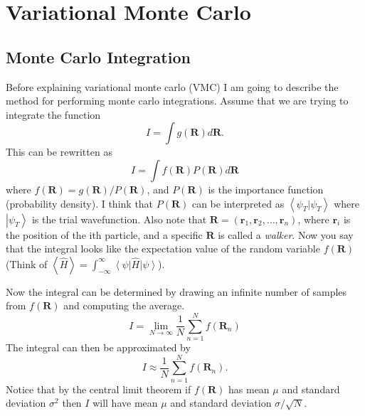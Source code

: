 \section*{Variational Monte Carlo}
\subsection*{Monte Carlo Integration}
Before explaining variational monte carlo (VMC) I am going to describe the method for performing monte carlo integrations. Assume that we are trying to integrate the function
\begin{equation}
  I = \int g(\mathbf{R})d\mathbf{R}.
\end{equation}
This can be rewritten as
\begin{equation}
  I = \int f(\mathbf{R})P(\mathbf{R})d\mathbf{R}
\end{equation}
where $f(\mathbf{R})=g(\mathbf{R})/P(\mathbf{R})$, and $P(\mathbf{R})$ is the importance function (probability density). I think that $P(\mathbf{R})$ can be interpreted as $\left<\psi_T|\psi_T\right>$ where $\left|\psi_T\right>$ is the trial wavefunction. Also note that $\mathbf{R}=(\mathbf{r}_1, \mathbf{r}_2, \ldots, \mathbf{r}_n)$, where $\mathbf{r}_i$ is the position of the ith particle, and a specific $\mathbf{R}$ is called a {\it walker}. Now you say that the integral looks like the expectation value of the random variable $f(\mathbf{R})$ (Think of $\left< \hat{H} \right> = \int_{-\infty}^{\infty} \left<\psi\right|\hat{H}\left|\psi\right>$).

Now the integral can be determined by drawing an infinite number of samples from $f(\mathbf{R})$ and computing the average.
\begin{equation}
  I = \lim_{N \to \infty} \frac{1}{N}\sum\limits_{n=1}^N f(\mathbf{R}_n)
\end{equation}
The integral can then be approximated by
\begin{equation}
  I \approx \frac{1}{N} \sum\limits_{n=1}^N f(\mathbf{R}_n).
\end{equation}
Notice that by the central limit theorem if $f(\mathbf{R})$ has mean $\mu$ and standard deviation $\sigma^2$ then $I$ will have mean $\mu$ and standard deviation $\sigma/\sqrt{N}$.

